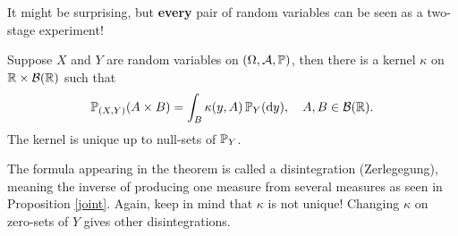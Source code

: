 It might be surprising, but \textbf{every} pair of random variables can be seen as a two-stage experiment!
\begin{lsuperwichtigersatzExistence}
\begin{theorem}\label{kernel}
	Suppose $X$ and $Y$ are random variables on $(\Omega, \mathcal A, \P)$, then there is a kernel $\kappa$ on $\R\times \mathcal B(\R)$ such that
	\begin{align}\label{main2}
		\P_{(X,Y)}(A\times B)=\int_B \kappa(y,A) \,\P_Y(\mathrm d y),\quad A, B\in \mathcal B(\R).
	\end{align}
	The kernel is unique up to null-sets of $\P_Y$.
\end{theorem}
\end{lsuperwichtigersatzExistence}
The formula appearing in the theorem is called a disintegration (\glq Zerlegegung\grq), meaning the inverse of producing one measure from several measures as seen in Proposition \ref{joint}. Again, keep in mind that $\kappa$ is not unique! Changing $\kappa$ on zero-sets of $Y$ gives other disintegrations. 
